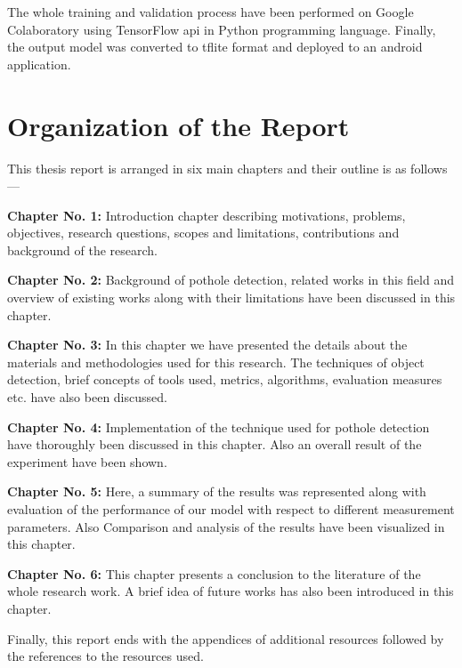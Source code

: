     The whole training and validation process have been performed on Google Colaboratory using TensorFlow\cite{dillon2017tensorflow} \acrshort{api} in Python programming language. Finally, the output model was converted to \gls{tflite} format and deployed to an android application.
    
\section{Organization of the Report}
    This thesis report is arranged in six main chapters and their outline is as follows---
    
    \vspace{3mm}\textbf{Chapter No. 1:} Introduction chapter describing motivations, problems, objectives, research questions, scopes and limitations, contributions and background of the research.
    
    \vspace{3mm}\textbf{Chapter No. 2:} Background of pothole detection, related works in this field and overview of existing works along with their limitations have been discussed in this chapter.
    
    \vspace{3mm}\textbf{Chapter No. 3:} In this chapter we have presented the details about the materials and methodologies used for this research. The techniques of object detection, brief concepts of tools used, metrics, algorithms, evaluation measures etc. have also been discussed.
    
    \vspace{3mm}\textbf{Chapter No. 4:} Implementation of the technique used for pothole detection have thoroughly been discussed in this chapter. Also an overall result of the experiment have been shown.
    
    \vspace{3mm}\textbf{Chapter No. 5:} Here, a summary of the results was represented along with evaluation of the performance of our model with respect to different measurement parameters. Also Comparison and analysis of the results have been visualized in this chapter.
    
    \vspace{3mm}\textbf{Chapter No. 6:} This chapter presents a conclusion to the literature of the whole research work. A brief idea of future works has also been introduced in this chapter.
    
    \vspace{5mm} Finally, this report ends with the appendices of additional resources followed by the references to the resources used.
